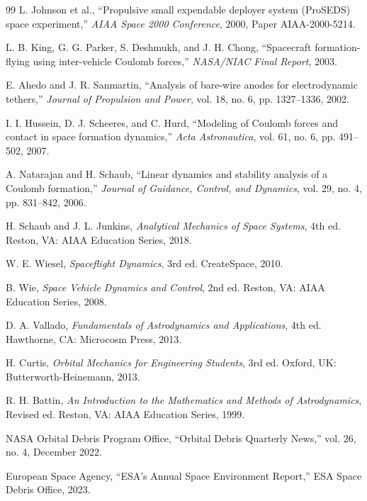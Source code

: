 \documentclass[12pt,a4paper]{article}
\begin{document}
\begin{thebibliography}{99}
L. Johnson et al.,
``Propulsive small expendable deployer system (ProSEDS) space experiment,''
\textit{AIAA Space 2000 Conference}, 2000, Paper AIAA-2000-5214.

L. B. King, G. G. Parker, S. Deshmukh, and J. H. Chong,
``Spacecraft formation-flying using inter-vehicle Coulomb forces,''
\textit{NASA/NIAC Final Report}, 2003.

E. Ahedo and J. R. Sanmartin,
``Analysis of bare-wire anodes for electrodynamic tethers,''
\textit{Journal of Propulsion and Power}, vol. 18, no. 6, pp. 1327--1336, 2002.

I. I. Hussein, D. J. Scheeres, and C. Hurd,
``Modeling of Coulomb forces and contact in space formation dynamics,''
\textit{Acta Astronautica}, vol. 61, no. 6, pp. 491--502, 2007.

A. Natarajan and H. Schaub,
``Linear dynamics and stability analysis of a Coulomb formation,''
\textit{Journal of Guidance, Control, and Dynamics}, vol. 29, no. 4, pp. 831--842, 2006.

H. Schaub and J. L. Junkins,
\textit{Analytical Mechanics of Space Systems},
4th ed. Reston, VA: AIAA Education Series, 2018.

W. E. Wiesel,
\textit{Spaceflight Dynamics},
3rd ed. CreateSpace, 2010.

B. Wie,
\textit{Space Vehicle Dynamics and Control},
2nd ed. Reston, VA: AIAA Education Series, 2008.

D. A. Vallado,
\textit{Fundamentals of Astrodynamics and Applications},
4th ed. Hawthorne, CA: Microcosm Press, 2013.

H. Curtis,
\textit{Orbital Mechanics for Engineering Students},
3rd ed. Oxford, UK: Butterworth-Heinemann, 2013.

R. H. Battin,
\textit{An Introduction to the Mathematics and Methods of Astrodynamics},
Revised ed. Reston, VA: AIAA Education Series, 1999.

NASA Orbital Debris Program Office,
``Orbital Debris Quarterly News,'' vol. 26, no. 4, December 2022.

European Space Agency,
``ESA's Annual Space Environment Report,''
ESA Space Debris Office, 2023.

\end{thebibliography}
\end{document}
